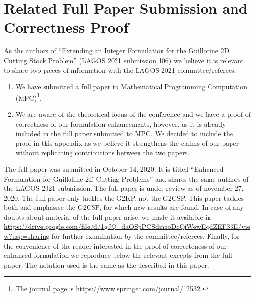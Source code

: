 \documentclass[9pt]{entcs}
\begin{document}
\begin{comment}
\begin{algorithm}[h]
\begin{alg}
  Step 1:  Write the paper\\
  Step 2: Format it with the ENTCS macro package\\
  Step 3:  Ship the whole thing to the Guest Editors
\end{alg}
\end{algorithm}
\end{comment}

\appendix
\section{Related Full Paper Submission and Correctness Proof}

As the authors of ``Extending an Integer Formulation for the Guillotine 2D Cutting Stock Problem'' (LAGOS 2021 submission 106) we believe it is relevant to share two pieces of information with the LAGOS 2021 committee/referees:

\begin{enumerate}
\item We have submitted a full paper to Mathematical Programming Computation (MPC)\footnote{The journal page is \url{https://www.springer.com/journal/12532}.}.
\item We are aware of the theoretical focus of the conference and we have a proof of correctness of our formulation enhancements, however, as it is already included in the full paper submitted to MPC. We decided to include the proof in this appendix as we believe it strengthens the claims of our paper without replicating contributions between the two papers.
\end{enumerate}

The full paper was submitted in October 14, 2020.
It is titled ``Enhanced Formulation for Guillotine 2D Cutting Problems'' and shares the same authors of the LAGOS 2021 submission.
The full paper is under review as of november 27, 2020.
The full paper only tackles the G2KP, not the G2CSP.
This paper tackles both and emphasise the G2CSP, for which new results are found.
In case of any doubts about material of the full paper arise, we made it available in \url{https://drive.google.com/file/d/1gJQ_daQSpPCSdmzoDcQiWewEqdZEF33E/view?usp=sharing} for further examination by the committee/referees.
Finally, for the convenience of the reader interested in the proof of correcteness of our enhanced formulation we reproduce below the relevant excepts from the full paper.
The notation used is the same as the described in this paper.
\end{document}
